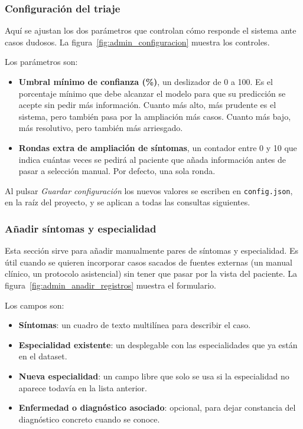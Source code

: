 \subsubsection*{Configuración del triaje}

Aquí se ajustan los dos parámetros que controlan cómo responde el sistema ante casos dudosos. La figura~\ref{fig:admin_configuracion} muestra los controles.


Los parámetros son:

\begin{itemize}
	\item \textbf{Umbral mínimo de confianza (\%)}, un deslizador de 0 a 100. Es el porcentaje mínimo que debe alcanzar el modelo para que su predicción se acepte sin pedir más información. Cuanto más alto, más prudente es el sistema, pero también pasa por la ampliación más casos. Cuanto más bajo, más resolutivo, pero también más arriesgado.
	\item \textbf{Rondas extra de ampliación de síntomas}, un contador entre 0 y 10 que indica cuántas veces se pedirá al paciente que añada información antes de pasar a selección manual. Por defecto, una sola ronda.
\end{itemize}

Al pulsar \textit{Guardar configuración} los nuevos valores se escriben en \texttt{config.json}, en la raíz del proyecto, y se aplican a todas las consultas siguientes.

\subsubsection*{Añadir síntomas y especialidad}

Esta sección sirve para añadir manualmente pares de síntomas y especialidad. Es útil cuando se quieren incorporar casos sacados de fuentes externas (un manual clínico, un protocolo asistencial) sin tener que pasar por la vista del paciente. La figura~\ref{fig:admin_anadir_registros} muestra el formulario.


Los campos son:

\begin{itemize}
	\item \textbf{Síntomas}: un cuadro de texto multilínea para describir el caso.
	\item \textbf{Especialidad existente}: un desplegable con las especialidades que ya están en el dataset.
	\item \textbf{Nueva especialidad}: un campo libre que solo se usa si la especialidad no aparece todavía en la lista anterior.
	\item \textbf{Enfermedad o diagnóstico asociado}: opcional, para dejar constancia del diagnóstico concreto cuando se conoce.
\end{itemize}

